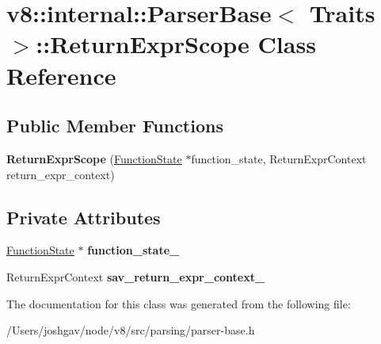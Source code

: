 \hypertarget{classv8_1_1internal_1_1_parser_base_1_1_return_expr_scope}{}\section{v8\+:\+:internal\+:\+:Parser\+Base$<$ Traits $>$\+:\+:Return\+Expr\+Scope Class Reference}
\label{classv8_1_1internal_1_1_parser_base_1_1_return_expr_scope}
\subsection*{Public Member Functions}
\begin{DoxyCompactItemize}
\item 
{\bfseries Return\+Expr\+Scope} (\hyperlink{classv8_1_1internal_1_1_function_state}{Function\+State} $\ast$function\+\_\+state, Return\+Expr\+Context return\+\_\+expr\+\_\+context)\hypertarget{classv8_1_1internal_1_1_parser_base_1_1_return_expr_scope_a4e5cf4b502d38fda80941ec7dc9e507b}{}\label{classv8_1_1internal_1_1_parser_base_1_1_return_expr_scope_a4e5cf4b502d38fda80941ec7dc9e507b}

\end{DoxyCompactItemize}
\subsection*{Private Attributes}
\begin{DoxyCompactItemize}
\item 
\hyperlink{classv8_1_1internal_1_1_function_state}{Function\+State} $\ast$ {\bfseries function\+\_\+state\+\_\+}\hypertarget{classv8_1_1internal_1_1_parser_base_1_1_return_expr_scope_a5772137c16936dbe19b6b9fd496d9c30}{}\label{classv8_1_1internal_1_1_parser_base_1_1_return_expr_scope_a5772137c16936dbe19b6b9fd496d9c30}

\item 
Return\+Expr\+Context {\bfseries sav\+\_\+return\+\_\+expr\+\_\+context\+\_\+}\hypertarget{classv8_1_1internal_1_1_parser_base_1_1_return_expr_scope_a192c602085183ae402987179b8490682}{}\label{classv8_1_1internal_1_1_parser_base_1_1_return_expr_scope_a192c602085183ae402987179b8490682}

\end{DoxyCompactItemize}


The documentation for this class was generated from the following file\+:\begin{DoxyCompactItemize}
\item 
/\+Users/joshgav/node/v8/src/parsing/parser-\/base.\+h\end{DoxyCompactItemize}
